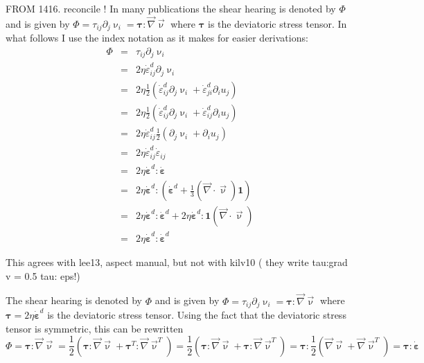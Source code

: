 \documentclass[a4paper,11pt]{article}
\begin{document}
FROM 1416. reconcile !
In many publications the shear hearing is denoted by $\Phi$ and is given by 
$\Phi=\tau_{ij}\partial_j \upnu_i={\bm \tau}:{\vec \nabla}{\vec \upnu}$ where 
${\bm \tau}$ is the deviatoric stress tensor.
In what follows I use the index notation as it makes for easier derivations:
\begin{eqnarray}
\Phi 
&=& \tau_{ij}\partial_j \upnu_i \nonumber\\
&=& 2 \eta \dot{\varepsilon}_{ij}^d\partial_j \upnu_i \nonumber\\
&=& 2 \eta \frac{1}{2}\left( \dot{\varepsilon}_{ij}^d\partial_j \upnu_i + \dot{\varepsilon}_{ji}^d\partial_i u_j \right) \nonumber\\
&=& 2 \eta \frac{1}{2}\left( \dot{\varepsilon}_{ij}^d\partial_j \upnu_i + \dot{\varepsilon}_{ij}^d\partial_i u_j \right) \nonumber\\
&=& 2 \eta  \dot{\varepsilon}_{ij}^d  \frac{1}{2}\left(\partial_j \upnu_i + \partial_i u_j \right) \nonumber\\
&=& 2 \eta  \dot{\varepsilon}_{ij}^d   \dot{\varepsilon}_{ij} \nonumber\\
&=& 2 \eta  \dot{\bm \varepsilon}^d :  \dot{\bm \varepsilon} \nonumber\\
&=& 2 \eta  \dot{\bm \varepsilon}^d : \left( \dot{\bm \varepsilon}^d +\frac{1}{3} ({\vec \nabla}\cdot{\vec \upnu}) {\bm 1} \right)\nonumber\\
&=& 2 \eta  \dot{\bm \varepsilon}^d : \dot{\bm \varepsilon}^d 
+ 2 \eta  \dot{\bm \varepsilon}^d : {\bm 1} ({\vec \nabla}\cdot{\vec \upnu}) \nonumber\\ 
&=& 2 \eta  \dot{\bm \varepsilon}^d : \dot{\bm \varepsilon}^d \label{eq:physicsshearheating} 
\end{eqnarray}

This agrees with lee13, aspect manual, but not with kilv10 (
they write tau:grad v = 0.5 tau: eps!)


The shear hearing is denoted by $\Phi$ and is given by 
$\Phi=\tau_{ij}\partial_j \upnu_i={\bm \tau}:{\vec \nabla}{\vec \upnu}$ where 
${\bm \tau}=2\eta \dot{\bm \varepsilon}^d$ is the deviatoric stress tensor.
Using the fact that the deviatoric stress tensor is symmetric, this can be rewritten
\[
\Phi = {\bm \tau}:{\vec \nabla}{\vec \upnu} 
= \frac{1}{2}  \left( {\bm \tau}:{\vec \nabla}{\vec \upnu} + {\bm \tau}^T:{\vec \nabla}{\vec \upnu}^T \right)
= \frac{1}{2}  \left( {\bm \tau}:{\vec \nabla}{\vec \upnu} + {\bm \tau}:{\vec \nabla}{\vec \upnu}^T \right)
=  {\bm \tau}: \frac{1}{2}\left( {\vec \nabla}{\vec \upnu} + {\vec \nabla}{\vec \upnu}^T \right)
=  {\bm \tau}:  \dot{\bm \varepsilon} 
\]
\end{document}
